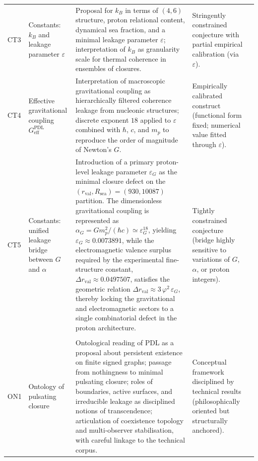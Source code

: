 \documentclass{article}
\newcommand{\PDL}{\mathrm{PDL}}
\begin{document}
\begin{longtable}{L{0.8cm}L{2.5cm}L{5cm}L{3.2cm}L{1cm}}
CT3 &
Constants: $k_B$ and leakage parameter $\varepsilon$ &
Proposal for $k_B$ in terms of $(4,6)$ structure, proton relational content, dynamical sea fraction, and a minimal leakage parameter $\varepsilon$; interpretation of $k_B$ as granularity scale for thermal coherence in ensembles of closures. &
Stringently constrained conjecture with partial empirical calibration (via $\varepsilon$). &
\citep{PDL_Main_2026,Coherence_Leakage_18_2026,PDL_position} \\[0.4em]

CT4 &
Effective gravitational coupling $G_{\mathrm{eff}}^{\PDL}$ &
Interpretation of macroscopic gravitational coupling as hierarchically filtered coherence leakage from nucleonic structures; discrete exponent $18$ applied to $\varepsilon$ combined with $\hbar$, $c$, and $m_p$ to reproduce the order of magnitude of Newton’s $G$. &
Empirically calibrated construct (functional form fixed; numerical value fitted through $\varepsilon$). &
\citep{Exponent_18_PDL_2026,Coherence_Leakage_18_2026,PDL_Main_2026,PDL_position} \\[0.4em]

CT5 &
Constants: unified leakage bridge between $G$ and $\alpha$ &
Introduction of a primary proton-level leakage parameter $\varepsilon_G$ as the minimal closure defect on the $(r_{\mathrm{val}},R_{\mathrm{sea}})=(930,10087)$ partition. The dimensionless gravitational coupling is represented as $\alpha_G = G m_p^2 / (\hbar c) \simeq \varepsilon_G^{18}$, yielding $\varepsilon_G \approx 0.0073891$, while the electromagnetic valence surplus required by the experimental fine-structure constant, $\Delta r_{\mathrm{val}} \approx 0.0497507$, satisfies the geometric relation $\Delta r_{\mathrm{val}} \approx 3\,\varphi^2\,\varepsilon_G$, thereby locking the gravitational and electromagnetic sectors to a single combinatorial defect in the proton architecture. &
Tightly constrained conjecture (bridge highly sensitive to variations of $G$, $\alpha$, or proton integers). &
\citep{Exponent_18_PDL_2026,Alpha_PDL_v2_2026,Universal_Coherence_Leakage_2026} \\\\[0.4em]


ON1 &
Ontology of pulsating closure &
Ontological reading of PDL as a proposal about persistent existence on finite signed graphs; passage from nothingness to minimal pulsating closure; roles of boundaries, active surfaces, and irreducible leakage as disciplined notions of transcendence; articulation of coexistence topology and multi‑observer stabilisation, with careful linkage to the technical corpus. &
Conceptual framework disciplined by technical results (philosophically oriented but structurally anchored). &
\citep{ExistencePulsatingClosure2026,PDL_Main_2026,PDL_position,PDL_TO_dialogue} \\[0.4em]


\end{longtable}
\end{document}
